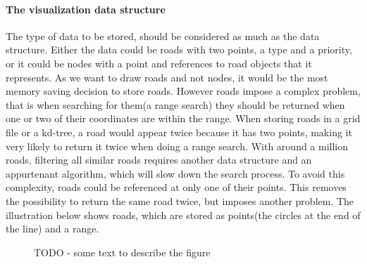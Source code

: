\documentclass[a4paper,10pt,titlepage]{article}
\begin{document}
\paragraph{The visualization data structure}

The type of data to be stored, should be considered as much as the data structure. Either the data could be roads with two points, a type and a priority, or it could be nodes with a point and references to road objects that it represents. As we want to draw roads and not nodes, it would be the most memory saving decision to store roads. However roads impose a complex problem, that is when searching for them(a range search) they should be returned when one or two of their coordinates are within the range. When storing roads in a grid file or a kd-tree, a road would appear twice because it has two points, making it very likely to return it twice when doing a range search. With around a million roads, filtering all similar roads requires another data structure and an appurtenant algorithm, which will slow down the search process. To avoid this complexity, roads could be referenced at only one of their points. This removes the possibility to return the same road twice, but imposes another problem. The illustration below shows roads, which are stored as points(the circles at the end of the line) and a range.

\begin{figure}[H]
\caption{TODO - some text to describe the figure}
\label{fig:roadsDS}
\end{figure}
\end{document}
